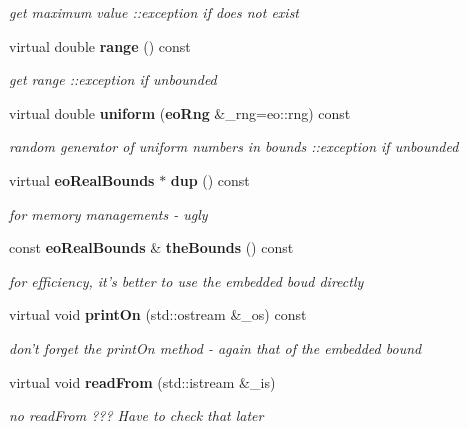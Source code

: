 \begin{CompactItemize}
\begin{CompactList}\small\item\em get maximum value ::exception if does not exist \item\end{CompactList}\item 
virtual double {\bf range} () const \label{classeo_general_real_bounds_a13}

\begin{CompactList}\small\item\em get range ::exception if unbounded \item\end{CompactList}\item 
virtual double {\bf uniform} ({\bf eo\-Rng} \&\_\-rng=eo::rng) const \label{classeo_general_real_bounds_a14}

\begin{CompactList}\small\item\em random generator of uniform numbers in bounds ::exception if unbounded \item\end{CompactList}\item 
virtual {\bf eo\-Real\-Bounds} $\ast$ {\bf dup} () const \label{classeo_general_real_bounds_a15}

\begin{CompactList}\small\item\em for memory managements - ugly \item\end{CompactList}\item 
const {\bf eo\-Real\-Bounds} \& {\bf the\-Bounds} () const \label{classeo_general_real_bounds_a16}

\begin{CompactList}\small\item\em for efficiency, it's better to use the embedded boud directly \item\end{CompactList}\item 
virtual void {\bf print\-On} (std::ostream \&\_\-os) const \label{classeo_general_real_bounds_a17}

\begin{CompactList}\small\item\em don't forget the print\-On method - again that of the embedded bound \item\end{CompactList}\item 
virtual void {\bf read\-From} (std::istream \&\_\-is)\label{classeo_general_real_bounds_a18}

\begin{CompactList}\small\item\em no read\-From ??? Have to check that later \item\end{CompactList}\end{CompactItemize}
